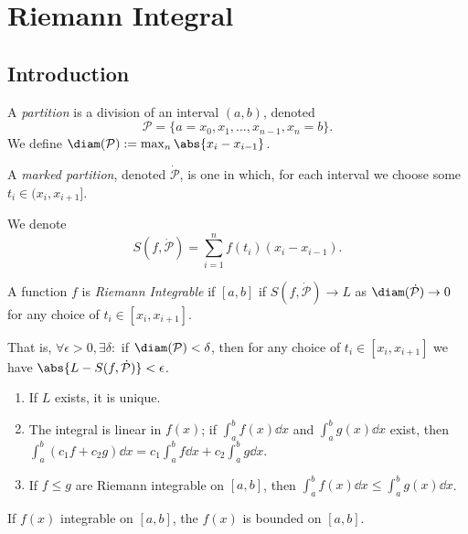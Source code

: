 \section{Riemann Integral}

\subsection{Introduction}
\begin{definition}[Partitions]
    A \emph{partition} is a division of an interval $(a, b)$, denoted \[
    \mathcal{P} = \{a = x_0, x_1, \dots, x_{n-1}, x_n = b\}    .
    \]
    We define $\diam (\mathcal{P})  := \max_{n} \abs{x_{i} - x_{i-1}}$.

    A \emph{marked partition}, denoted $\dot{\mathcal{P}}$, is one in which, for each interval we choose some $t_i \in (x_i, x_{i+1}]$.
\end{definition}

\begin{definition}
    We denote \[
    S(f,\dot{\mathcal{P}}) = \sum_{i=1}^n f(t_i)(x_{i}-x_{i-1}).
    \]
\end{definition}

\begin{definition}
    A function $f$ is \emph{Riemann Integrable} if $[a, b]$ if $S(f, \dot{\mathcal{P}}) \to L$ as $\diam(\dot{\mathcal{P}}) \to 0$ for any choice of $t_i \in [x_i, x_{i+1}]$.

    That is, $\forall \epsilon > 0, \exists \delta : $ if $\diam(\mathcal{P}) < \delta$, then for any choice of $t_i \in [x_i, x_{i+1}]$ we have $\abs{L - S(f, \dot{\mathcal{P}})} < \epsilon$.
\end{definition}

\begin{proposition}
    \begin{enumerate}
        \item If $L$ exists, it is unique.
        \item The integral is linear in $f(x)$; if $\int_a^b f(x)\dd{x}$ and $\int_a^b g(x) \dd{x}$ exist, then $\int_a^b (c_1 f+ c_2 g)\dd{x} = c_1\int_a^b f \dd{x} + c_2 \int_a^b g \dd{x}$.
        \item If $f \leq g$ are Riemann integrable on $[a, b]$, then $\int_a^b f(x) \dd{x} \leq \int_a^b g(x) \dd{x}$.
    \end{enumerate}
\end{proposition}

\begin{proposition}
    If $f(x)$ integrable on $[a, b]$, the $f(x)$ is bounded on $[a, b]$.
\end{proposition}

